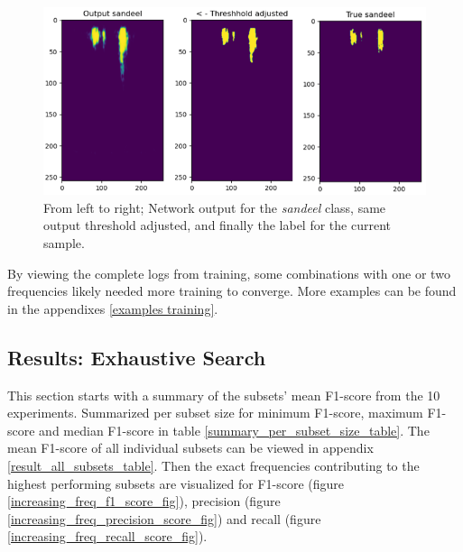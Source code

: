         \begin{figure}[H]
            \centering
            \includegraphics[scale=0.7]{figures/SANDEEL_WITH_LABEL.png}
            \caption[Example output, threshold and label]{From left to right; Network output for the \textit{sandeel} class, same output threshold adjusted, and finally the label for the current sample.}
          	\medskip 
            \label{sandeel_threshold_label}
        \end{figure}
    
    
     By viewing the complete logs from training, some combinations with one or two frequencies likely needed more training to converge. More examples can be found in the appendixes \ref{examples training}.
    

\subsection{Results: Exhaustive Search}
    This section starts with a summary of the subsets' mean F1-score from the 10 experiments. Summarized per subset size for minimum F1-score, maximum F1-score and median F1-score in table \ref{summary_per_subset_size_table}. The mean F1-score of all individual subsets can be viewed in appendix \ref{result_all_subsets_table}. Then the exact frequencies contributing to the highest performing subsets are visualized for F1-score (figure \ref{increasing_freq_f1_score_fig}), precision (figure \ref{increasing_freq_precision_score_fig}) and recall (figure \ref{increasing_freq_recall_score_fig}).


